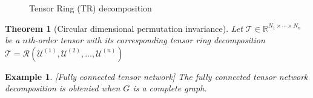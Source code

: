 \documentclass[11pt,a4paper,openright,oneside]{book}
\numberwithin{equation}{section}
\newtheorem{thm0}[defn0]{Theorem}
\newtheorem{example0}[defn0]{Example}
\newenvironment{theorem}{\bigskip \begin{thm0}}{\end{thm0}}
\newenvironment{example}{ \begin{example0}\rm}{\end{example0}}
\begin{document}
\begin{figure}[h]
    \caption{Tensor Ring (TR) decomposition}
    \label{tr:schema}
\end{figure}

\begin{theorem} [Circular dimensional permutation invariance] Let $\mathcal{T} \in \mathbb{R}^{N_1 \times \cdots \times N_n}$ be
    a $n$th-order tensor with its corresponding tensor ring decomposition $\mathcal{T} = \mathcal{R}(\mathcal{U}^{(1)}, \mathcal{U}^{(2)}, \dots, \mathcal{U}^{(n)})$

\end{theorem}

\begin{example}[Fully connected tensor network]
The fully connected tensor network decomposition is obtenied when $G$ is a complete graph.
\end{example}
\end{document}
